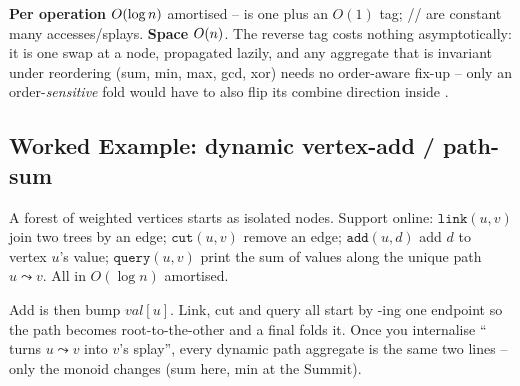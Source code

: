 \begin{complexitybox}
\textbf{Per operation} \(O(\log n)\) amortised --  is one
 plus an \(O(1)\) tag; // are
constant many accesses/splays. \textbf{Space} \(O(n)\). The reverse tag costs
nothing asymptotically: it is one swap at a node, propagated lazily, and any
aggregate that is invariant under reordering (sum, min, max, gcd, xor) needs no
order-aware fix-up -- only an order-\emph{sensitive} fold would have to also flip
its combine direction inside .
\end{complexitybox}

\subsection{Worked Example: dynamic vertex-add / path-sum}

\begin{problemstatement}
A forest of weighted vertices starts as isolated nodes. Support online:
\(\texttt{link}(u,v)\) join two trees by an edge; \(\texttt{cut}(u,v)\) remove an
edge; \(\texttt{add}(u,d)\) add \(d\) to vertex \(u\)'s value; \(\texttt{query}(u,v)\)
print the sum of values along the unique path \(u\leadsto v\). All in
\(O(\log n)\) amortised.
\end{problemstatement}

\begin{insightbox}
Add is  then bump \(\mathit{val}[u]\). Link, cut and query all start
by -ing one endpoint so the path becomes root-to-the-other and a
final  folds it. Once you internalise ``
turns \(u\leadsto v\) into \(v\)'s splay'', every dynamic path aggregate is the same
two lines -- only the  monoid changes (sum here, min at the Summit).
\end{insightbox}

